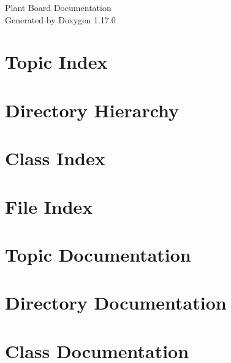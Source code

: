 \documentclass[twoside]{book}
\newcommand{\+}{\discretionary{\mbox{\scriptsize$\hookleftarrow$}}{}{}}
\newcommand{\clearemptydoublepage}{%
    \newpage{\pagestyle{empty}\cleardoublepage}%
  }
\begin{document}
  \raggedbottom
    \hypersetup{pageanchor=false,
                bookmarksnumbered=true,
                pdfencoding=unicode
               }
  \begin{titlepage}
  \vspace*{7cm}
  \begin{center}%
  {\Large Plant Board Documentation}\\
  \vspace*{1cm}
  {\large Generated by Doxygen 1.17.0}\\
  \end{center}
  \end{titlepage}
  \clearemptydoublepage
  \tableofcontents
  \clearemptydoublepage
  \hypersetup{pageanchor=true}
\chapter{Topic Index}

\chapter{Directory Hierarchy}

\chapter{Class Index}

\chapter{File Index}

\chapter{Topic Documentation}

\chapter{Directory Documentation}


\chapter{Class Documentation}




\end{document}
